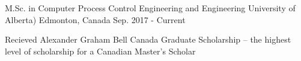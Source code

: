

\begin{cventries}

  \cventry
    {M.Sc. in Computer Process Control Engineering and Engineering} %
    {University of Alberta)} %
    {Edmonton, Canada} %
    {Sep. 2017 - Current} %
    {
      \begin{cvitems} %
        \item {Recieved Alexander Graham Bell Canada Graduate Scholarship – the highest level of scholarship for a Canadian Master's Scholar}
      \end{cvitems}
    }

\end{cventries}
